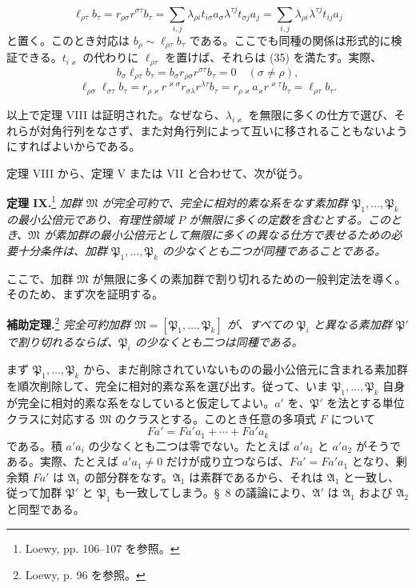 \documentclass[11pt]{article}
\begin{document}
\[
 \ell_{\rho\tau}b_\tau=r_{\rho\sigma}r^{\sigma\tau}b_\tau
 =\sum_{i,j}\lambda_{\rho i}t_{i\sigma}a_\sigma\lambda^{\tau j}t_{\sigma j}a_j
 =\sum_{i,j}\lambda_{\rho i}\lambda^{\tau j}t_{ij}a_j
\]
と置く。このとき対応は $b_\rho\sim\ell_{\rho\tau}b_\tau$ である。ここでも同種の関係は形式的に検証できる。$t_{i\varkappa}$ の代わりに $\ell_{\rho\tau}$ を置けば、それらは (35) を満たす。実際、
\[
 b_\sigma\ell_{\rho\tau}b_\tau=b_\sigma r_{\rho\sigma}r^{\sigma\tau}b_\tau=0\quad(\sigma\ne\rho),
\]
\[
 \ell_{\rho\sigma}\ell_{\sigma\tau}b_\tau=r_{\rho\varkappa}r^{\varkappa\sigma}r_{\sigma\lambda}r^{\lambda\tau}b_\tau
 =r_{\rho\varkappa}a_\varkappa r^{\varkappa\tau}b_\tau=\ell_{\rho\tau}b_\tau.
\]

以上で定理 VIII は証明された。なぜなら、$\lambda_{i\varkappa}$ を無限に多くの仕方で選び、それらが対角行列をなさず、また対角行列によって互いに移されることもないようにすればよいからである。

定理 VIII から、定理 V または VII と合わせて、次が従う。

\textbf{定理 IX.}\footnote{Loewy, pp. 106--107 を参照。} \emph{加群 $\mathfrak M$ が完全可約で、完全に相対的素な系をなす素加群 $\mathfrak P_1,\ldots,\mathfrak P_k$ の最小公倍元であり、有理性領域 $P$ が無限に多くの定数を含むとする。このとき、$\mathfrak M$ が素加群の最小公倍元として無限に多くの異なる仕方で表せるための必要十分条件は、加群 $\mathfrak P_1,\ldots,\mathfrak P_k$ の少なくとも二つが同種であることである。}

ここで、加群 $\mathfrak M$ が無限に多くの素加群で割り切れるための一般判定法を導く。そのため、まず次を証明する。

\textbf{補助定理.}\footnote{Loewy, p. 96 を参照。} \emph{完全可約加群 $\mathfrak M=[\mathfrak P_1,\ldots,\mathfrak P_k]$ が、すべての $\mathfrak P_i$ と異なる素加群 $\mathfrak P'$ で割り切れるならば、$\mathfrak P_i$ の少なくとも二つは同種である。}

まず $\mathfrak P_1,\ldots,\mathfrak P_k$ から、まだ削除されていないものの最小公倍元に含まれる素加群を順次削除して、完全に相対的素な系を選び出す。従って、いま $\mathfrak P_1,\ldots,\mathfrak P_k$ 自身が完全に相対的素な系をなしていると仮定してよい。$a'$ を、$\mathfrak P'$ を法とする単位クラスに対応する $\mathfrak M$ のクラスとする。このとき任意の多項式 $F$ について
\[
 Fa'=Fa'a_1+
\cdots+Fa'a_k
\]
である。積 $a'a_i$ の少なくとも二つは零でない。たとえば $a'a_1$ と $a'a_2$ がそうである。実際、たとえば $a'a_1\ne0$ だけが成り立つならば、$Fa'=Fa'a_1$ となり、剰余類 $Fa'$ は $\mathfrak A_1$ の部分群をなす。$\mathfrak A_1$ は素群であるから、それは $\mathfrak A_1$ と一致し、従って加群 $\mathfrak P'$ と $\mathfrak P_1$ も一致してしまう。\S~8 の議論により、$\mathfrak A'$ は $\mathfrak A_1$ および $\mathfrak A_2$ と同型である。
\end{document}
